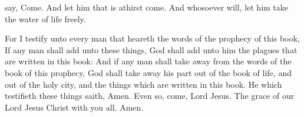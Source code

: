 {say,
Come.
And let him that is
athirst
come.
And whosoever
will, let him
take the
water of
life
freely.
\par }{\PP {}For I
testify unto every
man that
heareth the
words of the
prophecy of
this
book,
If any
man shall
add
unto these
things,
God shall
add
unto
him the
plagues that are
written
in
this
book:
And
if any
man shall take
away
from the
words of the
book of
this
prophecy,
God shall take
away
his
part
out of the
book of
life,
and out
of the
holy
city,
and
{} the
things which are
written
in
this
book.
He
which
testifieth these
things
saith,
{}
Amen. Even
so,
come,
Lord
Jesus.
The
grace of
our
Lord
Jesus
Christ
{}
with
you
all.
Amen.
\par }